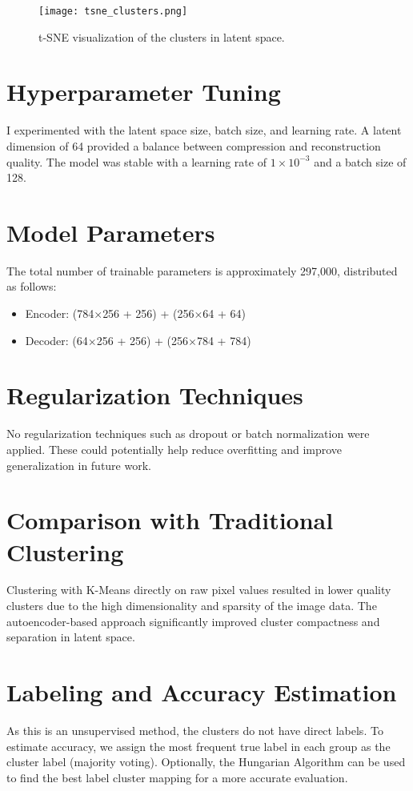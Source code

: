 \documentclass[conference]{IEEEtran}
\begin{document}
\begin{figure}[htbp]
\centerline{\texttt{[image: tsne\_clusters.png]}}
\caption{t-SNE visualization of the clusters in latent space.}
\label{fig_tsne}
\end{figure}


\section{Hyperparameter Tuning}
I experimented with the latent space size, batch size, and learning rate. A latent dimension of 64 provided a balance between compression and reconstruction quality. The model was stable with a learning rate of $1 \times 10^{-3}$ and a batch size of 128.

\section{Model Parameters}
The total number of trainable parameters is approximately 297,000, distributed as follows:

\begin{itemize}
    \item Encoder: (784$\times$256 + 256) + (256$\times$64 + 64)
    \item Decoder: (64$\times$256 + 256) + (256$\times$784 + 784)
\end{itemize}

\section{Regularization Techniques}
No regularization techniques such as dropout or batch normalization were applied. These could potentially help reduce overfitting and improve generalization in future work.

\section{Comparison with Traditional Clustering}
Clustering with K-Means directly on raw pixel values resulted in lower quality clusters due to the high dimensionality and sparsity of the image data. The autoencoder-based approach significantly improved cluster compactness and separation in latent space.

\section{Labeling and Accuracy Estimation}
As this is an unsupervised method, the clusters do not have direct labels. To estimate accuracy, we assign the most frequent true label in each group as the cluster label (majority voting). Optionally, the Hungarian Algorithm can be used to find the best label cluster mapping for a more accurate evaluation.
\end{document}

